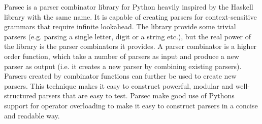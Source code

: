 Parsec is a parser combinator library for Python heavily inspired by the Haskell library with the same name. It is capable of creating parsers for context-sensitive grammars that require infinite lookahead. The library provide some trivial parsers (e.g. parsing a single letter, digit or a string etc.), but the real power of the library is the parser combinators it provides. A parser combinator is a higher order function, which take a number of parsers as input and produce a new parser as output (i.e. it creates a new parser by combining existing parsers). Parsers created by combinator functions can further be used to create new parsers. This technique makes it easy to construct powerful, modular and well-structured parsers that are easy to test. Parsec make good use of Pythons support for operator overloading to make it easy to construct parsers in a concise and readable way.


